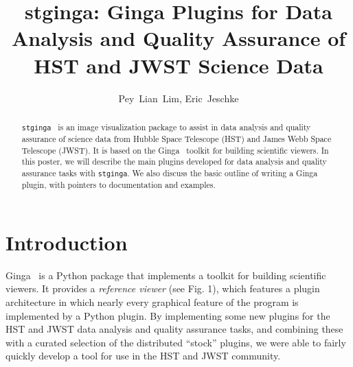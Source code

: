 \documentclass[11pt,twoside]{article}
\begin{document}
\title{stginga: Ginga Plugins for Data Analysis and Quality Assurance of
HST and JWST Science Data}

\author{Pey~Lian~Lim, Eric~Jeschke}


\begin{abstract}
{\tt stginga}~\citep*{stginga} is an image visualization package to assist
in data analysis and quality assurance of science data from Hubble Space
Telescope (HST) and James Webb Space Telescope (JWST).  It is based on the
Ginga~\citep*{ginga} toolkit for building scientific viewers.
In this poster, we will describe the main plugins developed for data
analysis and quality assurance tasks with {\tt stginga}.  We also discuss the
basic outline of writing a Ginga plugin, with pointers to documentation
and examples.
\end{abstract}

\section{Introduction}
Ginga~\citep*{Jeschke15A} is a Python package that
implements a toolkit for building scientific viewers.  It provides
a \emph{reference viewer} (see Fig. 1), which features
a plugin architecture in which nearly every graphical feature of the
program is implemented by a Python plugin.
By implementing some new plugins for the HST and JWST data analysis and
quality assurance tasks, and combining these with a curated selection of
the distributed ``stock'' plugins, we were able to fairly quickly
develop a tool for use in the HST and JWST community.

\end{document}
